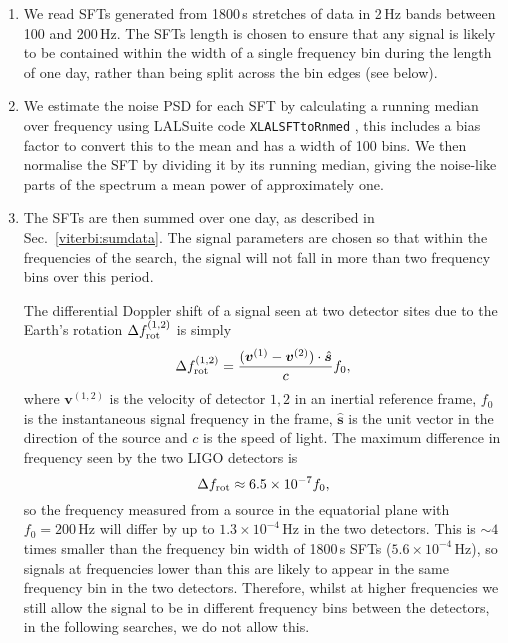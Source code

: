 \begin{enumerate}
%
\item We read \acp{SFT} generated from 1800\,s stretches of data in 2\,Hz
    bands between 100 and 200\,Hz. The \acp{SFT} length is chosen to ensure that any signal is likely to be contained within the width of a single
    frequency bin during the length of one day, rather than being split
    across the bin edges (see below).
%
\item We estimate the noise \ac{PSD} for each \ac{SFT} by calculating a
    running median over frequency using LALSuite
    code {\tt XLALSFTtoRnmed} \cite{lalsuite}, this includes a bias factor to
    convert this to the mean and has a width of 100 bins. We then normalise the \ac{SFT} by dividing it
    by its running median, giving the noise-like parts of the spectrum a
    mean power of approximately one.

\item The \acp{SFT} are then summed over one day, as described in
    Sec.~\ref{viterbi:sumdata}. The signal parameters are chosen so that
    within the frequencies of the search, the signal will not fall in more than two frequency bins over this
    period.

    The differential Doppler shift of a signal seen at two detector sites due to the Earth's rotation $\Delta f^{(1,2)}_{\rm{rot}}$ is simply
%
\begin{equation} \label{results:doppler}
\Delta f^{(1,2)}_{\rm{rot}} = \frac{({{\bm v}^{(1)}} -{{\bm v}^{(2)}})\cdot
\hat{\bm s}}{c} f_0,
\end{equation}
%
where ${\bm v}^{(1,2)}$ is the velocity of detector $1,2$ in an inertial reference frame, $f_0$ is the
instantaneous signal frequency in the frame, $\hat{\bm s}$ is the unit vector in the direction of the source and  $c$ is the speed of light.
The maximum difference in frequency seen by the two \ac{LIGO} detectors
is 
\begin{equation} \label{results:doppler:diff}
\Delta f_{\rm rot} \approx 6.5\times 10^{-7} f_0,
\end{equation}
%
so the frequency measured from a source in the equatorial plane with $f_0=200$\,Hz will differ by up to $1.3 \times 10^{-4}$\,Hz in the two detectors.
This is $\sim 4$ times smaller than the frequency bin width of 1800\,s \acp{SFT} ($5.6 \times
10^{-4}$\,Hz), so signals at frequencies lower than this are likely to appear in the same frequency bin in the two detectors. Therefore, whilst at higher frequencies we still allow the signal to be in different frequency bins between the detectors, in the following searches, we do not allow this.
%


\end{enumerate}
